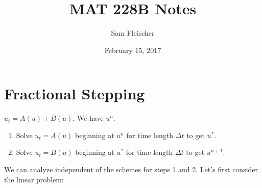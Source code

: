 \documentclass{article}
\title{MAT 228B Notes}
\author{Sam Fleischer}
\date{February 15, 2017}
\newcommand{\Dt}{\Delta t}
\begin{document}
    \maketitle

    \section{Fractional Stepping}
        $u_t = A(u) + B(u)$.  We have $u^n$.
        \begin{enumerate}
            \item Solve $u_t = A(u)$ beginning at $u^n$ for time length $\Dt$ to get $u^*$.
            \item Solve $u_t = B(u)$ beginning at $u^*$ for time length $\Dt$ to get $u^{n+1}$.
        \end{enumerate}
        We can analyze independent of the schemes for steps 1 and 2.  Let's first consider the linear problem:
\end{document}
